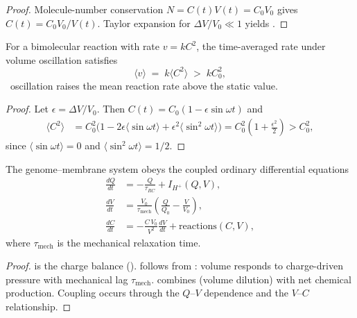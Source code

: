 \begin{proof}
Molecule-number conservation $N=C(t)V(t)=C_0 V_0$ gives $C(t)=C_0 V_0/V(t)$.
Taylor expansion for $\Delta V/V_0\ll 1$ yields .
\end{proof}

\begin{theorem}
\label{thm:ch03-rate-enhancement}
For a bimolecular reaction with rate $v=kC^2$, the time-averaged rate under
volume oscillation satisfies
\begin{equation}
    \langle v\rangle \;=\; k\langle C^2\rangle \;>\; k C_0^2,
    \label{eq:ch03-rate-enhance}
\end{equation}
\ie\ oscillation raises the mean reaction rate above the static value.
\end{theorem}

\begin{proof}
Let $\epsilon=\Delta V/V_0$.  Then $C(t)=C_0(1-\epsilon\sin\omega t)$ and
\begin{align*}
    \langle C^2\rangle
    &= C_0^2\bigl(1-2\epsilon\langle\sin\omega t\rangle
        +\epsilon^2\langle\sin^2\omega t\rangle\bigr)
    = C_0^2\!\left(1+\tfrac{\epsilon^2}{2}\right)
    > C_0^2,
\end{align*}
since $\langle\sin\omega t\rangle=0$ and $\langle\sin^2\omega t\rangle=1/2$.
\end{proof}

\begin{theorem}
\label{thm:ch03-coupled-dynamics}
The genome--membrane system obeys the coupled ordinary differential equations
\begin{align}
    \frac{dQ}{dt} &= -\frac{Q}{\tau_{RC}} + I_{H^+}(Q,V),
    \label{eq:ch03-dQ}\\
    \frac{dV}{dt} &= \frac{V_0}{\tau_\mathrm{mech}}\!\left(\frac{Q}{Q_0}-\frac{V}{V_0}\right),
    \label{eq:ch03-dV}\\
    \frac{dC}{dt} &= -\frac{C\,V_0}{V^2}\frac{dV}{dt} + \mathrm{reactions}(C,V),
    \label{eq:ch03-dC}
\end{align}
where $\tau_\mathrm{mech}$ is the mechanical relaxation time.
\end{theorem}

\begin{proof}
 is the charge balance ().
 follows from : volume responds
to charge-driven pressure with mechanical lag $\tau_\mathrm{mech}$.
 combines  (volume dilution) with
net chemical production.  Coupling occurs through the $Q$--$V$ dependence and
the $V$--$C$ relationship.
\end{proof}

